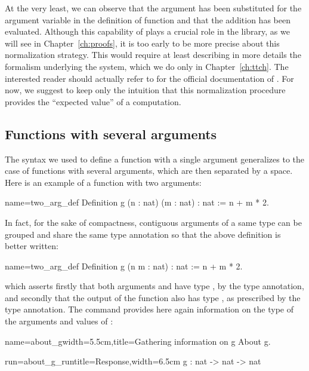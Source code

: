 At the very least, we can observe that the argument  has been
substituted for the argument variable in the definition of function
 and that the addition has been evaluated.
Although this capability of \Coq{} plays a crucial role
in the \mcbMC{} library, as we will see in Chapter~\ref{ch:proofs}, it
is too early to be
more precise about this normalization strategy. This would require
at least describing in more details the formalism underlying the
\Coq{} system, which we do only in Chapter~\ref{ch:ttch}. The
interested reader should actually refer to \cite[section
8.7.1]{Coq:manual} for the official documentation of .
For now, we suggest to keep only the intuition that this
normalization procedure provides the ``expected value'' of a
computation.


\subsection{Functions with several arguments}
\label{sec:fun-sev-args}
The syntax we used to define a function with a single argument
generalizes to the case of functions with several arguments, which are
then separated by a space. Here is an example of a function with two
arguments:

\begin{coq}{name=two_arg_def}{}
Definition g (n : nat) (m : nat) : nat := n + m * 2.
\end{coq}
In fact, for the sake of compactness, contiguous arguments of a same
type can be grouped and share the same type annotation so that the
above definition is better written:

\begin{coq}{name=two_arg_def}{}
Definition g (n m : nat) : nat := n + m * 2.
\end{coq}
which asserts firstly that both arguments  and  have type
, by the  type annotation, and secondly that the
output of the function also has type , as prescribed by the
 type annotation. The   command provides
here again information on the type of the arguments and values of
:

\begin{coq}{name=about_g}{width=5.5cm,title=Gathering information on g}
About g.
\end{coq}
\begin{coqout}{run=about_g_run}{title=Response,width=6.5cm}
g : nat -> nat -> nat
\end{coqout}

